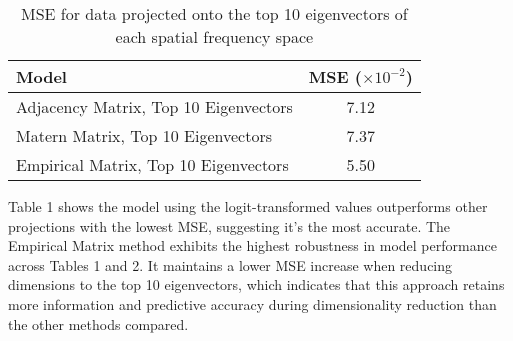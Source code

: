 \documentclass[12pt]{article}
\begin{document}
\begin{table}[h]
    \centering
    \begin{tabular}{l|c}
        \hline
        \textbf{Model}                        & \textbf{MSE (\( \times 10^{-2} \))} \\
        \hline
        Adjacency Matrix, Top 10 Eigenvectors & 7.12                                \\
        Matern Matrix, Top 10 Eigenvectors    & 7.37                                \\
        Empirical Matrix, Top 10 Eigenvectors & 5.50                                \\
        \hline
    \end{tabular}
    \caption{MSE for data projected onto the top 10 eigenvectors of each spatial frequency space}
    \label{tab:top_10_projection_mse}
\end{table}

Table 1 shows the model using the logit-transformed values outperforms other projections with the lowest MSE, suggesting it's the most accurate. The Empirical Matrix method exhibits the highest robustness in model performance across Tables 1 and 2. It maintains a lower MSE increase when reducing dimensions to the top 10 eigenvectors, which indicates that this approach retains more information and predictive accuracy during dimensionality reduction than the other methods compared.
\end{document}
